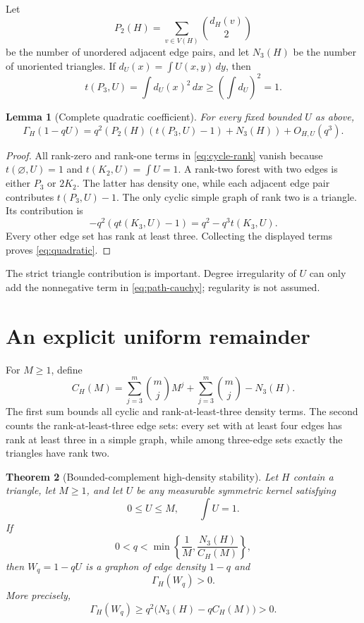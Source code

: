 \documentclass[11pt]{article}
\newtheorem{theorem}{Theorem}[section]
\newtheorem{lemma}[theorem]{Lemma}
\begin{document}
Let
\[
 P_2(H)=\sum_{v\in V(H)}\binom{d_H(v)}2
\]
be the number of unordered adjacent edge pairs, and let $N_3(H)$ be the
number of unoriented triangles.  If
$d_U(x)=\int U(x,y)\,dy$, then
\[
 t(P_3,U)=\int d_U(x)^2\,dx\geq
 \left(\int d_U\right)^2=1.
 \label{eq:path-cauchy}
\]

\begin{lemma}[Complete quadratic coefficient]
For every fixed bounded $U$ as above,
\begin{equation}
 \Gamma_H(1-qU)
 =q^2\left(
 P_2(H)(t(P_3,U)-1)+N_3(H)
 \right)+O_{H,U}(q^3).
 \label{eq:quadratic}
\end{equation}
\end{lemma}

\begin{proof}
All rank-zero and rank-one terms in \eqref{eq:cycle-rank} vanish because
$t(\varnothing,U)=1$ and $t(K_2,U)=\int U=1$.  A rank-two forest with two
edges is either $P_3$ or $2K_2$.  The latter has density one, while each
adjacent edge pair contributes $t(P_3,U)-1$.  The only cyclic simple graph
of rank two is a triangle.  Its contribution is
\[
 -q^2(qt(K_3,U)-1)=q^2-q^3t(K_3,U).
\]
Every other edge set has rank at least three.  Collecting the displayed
terms proves \eqref{eq:quadratic}.
\end{proof}

The strict triangle contribution is important.  Degree irregularity of $U$
can only add the nonnegative term in \eqref{eq:path-cauchy}; regularity is
not assumed.

\section{An explicit uniform remainder}

For $M\geq1$, define
\begin{equation}
 C_H(M)=
 \sum_{j=3}^{m}\binom mj M^j
 +\sum_{j=3}^{m}\binom mj-N_3(H).
 \label{eq:remainder-constant}
\end{equation}
The first sum bounds all cyclic and rank-at-least-three density terms.  The
second counts the rank-at-least-three edge sets: every set with at least four
edges has rank at least three in a simple graph, while among three-edge sets
exactly the triangles have rank two.

\begin{theorem}[Bounded-complement high-density stability]
Let $H$ contain a triangle, let $M\geq1$, and let $U$ be any measurable
symmetric kernel satisfying
\[
 0\leq U\leq M,\qquad \int U=1.
\]
If
\begin{equation}
 0<q<\min\left\{\frac1M,
 \frac{N_3(H)}{C_H(M)}\right\},
 \label{eq:q-range}
\end{equation}
then $W_q=1-qU$ is a graphon of edge density $1-q$ and
\[
 \Gamma_H(W_q)>0.
\]
More precisely,
\begin{equation}
 \Gamma_H(W_q)
 \geq q^2\bigl(N_3(H)-qC_H(M)\bigr)>0.
 \label{eq:explicit-lower}
\end{equation}
\end{theorem}
\end{document}
